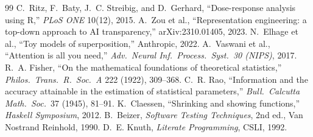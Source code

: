 \begin{thebibliography}{99}
 C.~Ritz, F.~Baty, J.~C. Streibig, and D.~Gerhard, ``Dose-response analysis using R,'' \emph{PLoS ONE} 10(12), 2015.
 A.~Zou et al., ``Representation engineering: a top-down approach to AI transparency,'' arXiv:2310.01405, 2023.
 N.~Elhage et al., ``Toy models of superposition,'' Anthropic, 2022.
 A.~Vaswani et al., ``Attention is all you need,'' \emph{Adv.\ Neural Inf.\ Process.\ Syst.\ 30 (NIPS)}, 2017.
 R.~A. Fisher, ``On the mathematical foundations of theoretical statistics,'' \emph{Philos.\ Trans.\ R.\ Soc.\ A} 222 (1922), 309--368.
 C.~R. Rao, ``Information and the accuracy attainable in the estimation of statistical parameters,'' \emph{Bull.\ Calcutta Math.\ Soc.}\ 37 (1945), 81--91.
 K.~Claessen, ``Shrinking and showing functions,'' \emph{Haskell Symposium}, 2012.
 B.~Beizer, \emph{Software Testing Techniques}, 2nd ed., Van Nostrand Reinhold, 1990.
 D.~E. Knuth, \emph{Literate Programming}, CSLI, 1992.
\end{thebibliography}
